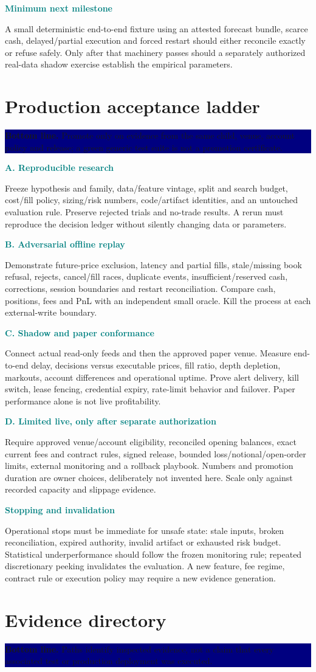 \documentclass[10pt,letterpaper]{article}
\newcommand{\bl}[1]{\noindent\colorbox{navy}{\parbox{\dimexpr\linewidth-2\fboxsep}{\color{white}\textbf{Bottom line.} #1}}\par\medskip}
\newcommand{\topic}[2]{\clearpage\section{#1}\bl{#2}}
\newcommand{\sub}[1]{\par\textbf{\textcolor{teal}{#1}}\par}
\begin{document}
\sub{Minimum next milestone}
A small deterministic end-to-end fixture using an attested forecast bundle, scarce cash, delayed/partial execution and forced restart should either reconcile exactly or refuse safely. Only after that machinery passes should a separately authorized real-data shadow exercise establish the empirical parameters.
\topic{Production acceptance ladder}{Promote only on evidence from the same child, venue, account policy and release; a green generic test suite is not a promotion certificate.}
\sub{A. Reproducible research}
Freeze hypothesis and family, data/feature vintage, split and search budget, cost/fill policy, sizing/risk numbers, code/artifact identities, and an untouched evaluation rule. Preserve rejected trials and no-trade results. A rerun must reproduce the decision ledger without silently changing data or parameters.
\sub{B. Adversarial offline replay}
Demonstrate future-price exclusion, latency and partial fills, stale/missing book refusal, rejects, cancel/fill races, duplicate events, insufficient/reserved cash, corrections, session boundaries and restart reconciliation. Compare cash, positions, fees and PnL with an independent small oracle. Kill the process at each external-write boundary.
\sub{C. Shadow and paper conformance}
Connect actual read-only feeds and then the approved paper venue. Measure end-to-end delay, decisions versus executable prices, fill ratio, depth depletion, markouts, account differences and operational uptime. Prove alert delivery, kill switch, lease fencing, credential expiry, rate-limit behavior and failover. Paper performance alone is not live profitability.
\sub{D. Limited live, only after separate authorization}
Require approved venue/account eligibility, reconciled opening balances, exact current fees and contract rules, signed release, bounded loss/notional/open-order limits, external monitoring and a rollback playbook. Numbers and promotion duration are owner choices, deliberately not invented here. Scale only against recorded capacity and slippage evidence.
\sub{Stopping and invalidation}
Operational stops must be immediate for unsafe state: stale inputs, broken reconciliation, expired authority, invalid artifact or exhausted risk budget. Statistical underperformance should follow the frozen monitoring rule; repeated discretionary peeking invalidates the evaluation. A new feature, fee regime, contract rule or execution policy may require a new evidence generation.
\topic{Evidence directory}{Paths identify inspected evidence, not a claim that every associated test or production deployment was executed.}
\end{document}
